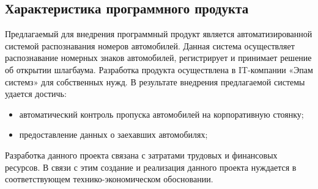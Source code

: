









\FPround{}


\subsection{Характеристика программного продукта }

Предлагаемый для внедрения программный продукт является автоматизированной системой распознавания номеров автомобилей. Данная система осуществляет распознавание номерных знаков автомобилей, регистрирует и принимает решение об открытии шлагбаума. 
Разработка продукта осуществлена в IT-компании «Эпам системз» для собственных нужд. В результате внедрения предлагаемой системы удается достичь:
\begin{itemize}
  \item автоматический контроль пропуска автомобилей на корпоративную стоянку;
  \item предоставление данных о заехавших автомобилях; 
\end{itemize}
Разработка данного проекта связана с затратами трудовых и финансовых ресурсов. В связи с этим создание и реализация данного проекта нуждается в соответствующем технико-экономическом обосновании.

